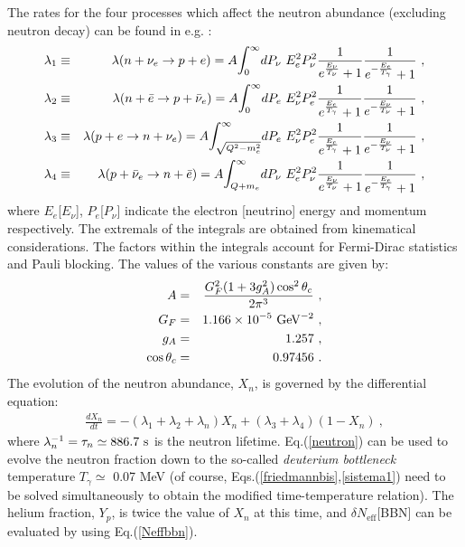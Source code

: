 \documentclass[12pt]{article}
\begin{document}
The rates for the four processes which affect the neutron abundance
(excluding neutron decay) can be found in e.g. \cite{weinberg}:
%
\begin{eqnarray}
\lambda _1 & \equiv & \lambda (n + \nu _e \rightarrow p + e) = A
\mathlarger \int ^{\infty}_{0} dP_{\nu} \ E_e^2 P_{\nu}^2
\frac{1}{e^{\frac{E_{\nu}}{T_{\nu}}}+1}
\frac{1}{e^{-\frac{E_e}{T_{\gamma}}}+1} \ , \nonumber
\\
\lambda _2 & \equiv & \lambda (n + \bar e \rightarrow p + \bar \nu _e) =
A \mathlarger \int ^{\infty}_{0} dP_e \ E_{\nu}^2 P_e^2
\frac{1}{e^{\frac{E_e}{T_{\gamma}}}+1}
\frac{1}{e^{-\frac{E_{\nu}}{T_{\nu}}}+1} \ , \nonumber
\\
\lambda _3 & \equiv & \lambda (p + e \rightarrow n + \nu _e) = A
\mathlarger \int ^{\infty}_{\sqrt{Q^2-m_e^2}} dP_e \ E_{\nu}^2 P_e^2
\frac{1}{e^{\frac{E_e}{T_{\gamma}}}+1}
\frac{1}{e^{-\frac{E_{\nu}}{T_{\nu}}}+1} \ , \nonumber
\\
\lambda _4 & \equiv & \lambda (p + \bar \nu _e \rightarrow n + \bar e) =
A \mathlarger \int ^{\infty}_{Q+m_e} dP_{\nu} \ E_e^2 P_{\nu}^2
\frac{1}{e^{\frac{E_{\nu}}{T_{\nu}}}+1}
\frac{1}{e^{-\frac{E_e}{T_{\gamma}}}+1} \ ,
\end{eqnarray}
%
where $E _e$[$E _{\nu}$], $P _e$[$P _{\nu}$] indicate the electron
[neutrino] energy and momentum respectively. The extremals of the
integrals are obtained from kinematical considerations. The factors
within the integrals account for Fermi-Dirac statistics and Pauli
blocking. The values of the various constants are given by:
%
\begin{eqnarray}
A & = & \frac{G_F^2 (1+3g_A^2)\cos ^2\theta _c}{2\pi ^3} \ , \nonumber
\\
G_F & = & 1.166 \times 10^{-5} \ {\rm GeV^{-2}} \ , \nonumber \\
g_A & = & 1.257 \ , \nonumber \\
\cos \theta _c & = & 0.97456 \ .
\end{eqnarray}
%
The evolution of the neutron abundance, $X _n$, is governed by the differential equation:
%
\begin{eqnarray}
\frac{dX _n}{dt} = -( \lambda _1 + \lambda _2 + \lambda _n)X _n +
(\lambda _3 + \lambda _4)(1 - X _n) \ ,
\label{neutron}
\end{eqnarray}
%
where $\lambda _n ^{-1} = \tau _n \simeq 886.7 \ \rm s$ is the neutron
lifetime. Eq.(\ref{neutron}) can be used to evolve the neutron fraction
down to the so-called \textit{deuterium bottleneck} temperature $T
_{\gamma} \simeq$ 0.07 MeV (of course,
Eqs.(\ref{friedmannbis},\ref{sistema1}) need to be solved simultaneously
to obtain the modified time-temperature relation). The helium fraction,
$Y _p$, is twice the value of $X _n$ at this time, and $\delta N
_{\text{eff}}$[BBN] can be evaluated by using Eq.(\ref{Neffbbn}).
\end{document}
